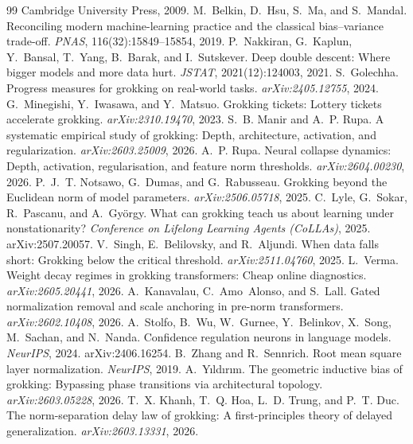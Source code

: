 \documentclass[10pt,twocolumn]{article}
\begin{document}
\begin{thebibliography}{99}
\newblock Cambridge University Press, 2009.
M.~Belkin, D.~Hsu, S.~Ma, and S.~Mandal.
\newblock Reconciling modern machine-learning practice and the classical bias--variance trade-off.
\newblock \emph{PNAS}, 116(32):15849--15854, 2019.
P.~Nakkiran, G.~Kaplun, Y.~Bansal, T.~Yang, B.~Barak, and I.~Sutskever.
\newblock Deep double descent: Where bigger models and more data hurt.
\newblock \emph{JSTAT}, 2021(12):124003, 2021.
S.~Golechha.
\newblock Progress measures for grokking on real-world tasks.
\newblock \emph{arXiv:2405.12755}, 2024.
G.~Minegishi, Y.~Iwasawa, and Y.~Matsuo.
\newblock Grokking tickets: Lottery tickets accelerate grokking.
\newblock \emph{arXiv:2310.19470}, 2023.
S.~B. Manir and A.~P. Rupa.
\newblock A systematic empirical study of grokking: Depth, architecture, activation, and regularization.
\newblock \emph{arXiv:2603.25009}, 2026.
A.~P. Rupa.
\newblock Neural collapse dynamics: Depth, activation, regularisation, and feature norm thresholds.
\newblock \emph{arXiv:2604.00230}, 2026.
P.~J.~T. Notsawo, G.~Dumas, and G.~Rabusseau.
\newblock Grokking beyond the Euclidean norm of model parameters.
\newblock \emph{arXiv:2506.05718}, 2025.
C.~Lyle, G.~Sokar, R.~Pascanu, and A.~Gy\"orgy.
\newblock What can grokking teach us about learning under nonstationarity?
\newblock \emph{Conference on Lifelong Learning Agents (CoLLAs)}, 2025. arXiv:2507.20057.
V.~Singh, E.~Belilovsky, and R.~Aljundi.
\newblock When data falls short: Grokking below the critical threshold.
\newblock \emph{arXiv:2511.04760}, 2025.
L.~Verma.
\newblock Weight decay regimes in grokking transformers: Cheap online diagnostics.
\newblock \emph{arXiv:2605.20441}, 2026.
A.~Kanavalau, C.~Amo~Alonso, and S.~Lall.
\newblock Gated normalization removal and scale anchoring in pre-norm transformers.
\newblock \emph{arXiv:2602.10408}, 2026.
A.~Stolfo, B.~Wu, W.~Gurnee, Y.~Belinkov, X.~Song, M.~Sachan, and N.~Nanda.
\newblock Confidence regulation neurons in language models.
\newblock \emph{NeurIPS}, 2024. arXiv:2406.16254.
B.~Zhang and R.~Sennrich.
\newblock Root mean square layer normalization.
\newblock \emph{NeurIPS}, 2019.
A.~Y{\i}ld{\i}r{\i}m.
\newblock The geometric inductive bias of grokking: Bypassing phase transitions via architectural topology.
\newblock \emph{arXiv:2603.05228}, 2026.
T.~X. Khanh, T.~Q. Hoa, L.~D. Trung, and P.~T. Duc.
\newblock The norm-separation delay law of grokking: A first-principles theory of delayed generalization.
\newblock \emph{arXiv:2603.13331}, 2026.
\end{thebibliography}
\end{document}
